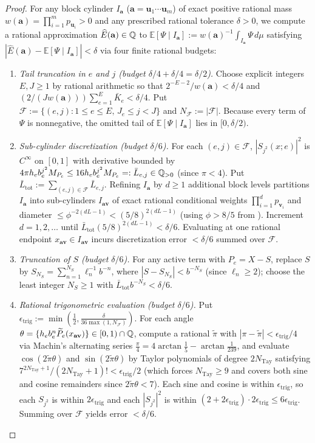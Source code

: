 \documentclass[11pt]{article}
\newcommand{\fr}[1]{\{#1\}}
\newcommand{\Ex}{\mathbb{E}}
\newcommand{\epsTrig}{\epsilon_{\mathrm{trig}}}
\newcommand{\NTay}{N_{\mathrm{Tay}}}
\begin{document}
\begin{proof}
For any block cylinder $I_{\mathbf{a}}$ ($\mathbf{a}=\mathbf{u}_1\cdots\mathbf{u}_m$) of exact positive rational mass $w(\mathbf{a})=\prod_{i=1}^m p_{\mathbf{u}_i}>0$ and any prescribed rational tolerance $\delta>0$, we compute a rational approximation $\widehat E(\mathbf{a})\in\mathbb Q$ to $\Ex[\Psi\mid I_{\mathbf{a}}]:=w(\mathbf{a})^{-1}\int_{I_{\mathbf{a}}}\Psi\,d\mu$ satisfying $|\widehat E(\mathbf{a})-\Ex[\Psi\mid I_{\mathbf{a}}]|<\delta$ via four finite rational budgets:
\begin{enumerate}[label=\textup{(\alph*)},nosep]
\item \emph{Tail truncation in $e$ and $j$ (budget $\delta/4+\delta/4=\delta/2$).} Choose explicit integers $E,J\ge1$ by rational arithmetic so that $2^{-E-2}/w(\mathbf{a})<\delta/4$ and $(2/(Jw(\mathbf{a})))\sum_{e=1}^E\bar K_e<\delta/4$. Put $\mathcal{F}:=\{(e,j):1\le e\le E,\,J_e\le j<J\}$ and $N_{\mathcal{F}}:=|\mathcal{F}|$. Because every term of $\Psi$ is nonnegative, the omitted tail of $\Ex[\Psi\mid I_{\mathbf{a}}]$ lies in $[0,\delta/2)$.
\item \emph{Sub-cylinder discretization (budget $\delta/6$).} For each $(e,j)\in\mathcal{F}$, $|S_{j^2}(x;e)|^2$ is $C^\infty$ on $[0,1]$ with derivative bounded by $4\pi h_eb_e^{j^2}M_{P_e}\le 16h_eb_e^{j^2}M_{P_e}=:\bar L_{e,j}\in\mathbb Q_{>0}$ (since $\pi<4$). Put $\bar L_{\mathrm{tot}}:=\sum_{(e,j)\in\mathcal{F}}\bar L_{e,j}$. Refining $I_{\mathbf{a}}$ by $d\ge1$ additional block levels partitions $I_{\mathbf{a}}$ into sub-cylinders $I_{\mathbf{a}\mathbf{v}}$ of exact rational conditional weights $\prod_{i=1}^d p_{\mathbf{v}_i}$ and diameter $\le\phi^{-2(dL-1)}<(5/8)^{2(dL-1)}$ (using $\phi>8/5$ from ). Increment $d=1,2,\dots$ until $\bar L_{\mathrm{tot}}(5/8)^{2(dL-1)}<\delta/6$. Evaluating at one rational endpoint $x_{\mathbf{a}\mathbf{v}}\in I_{\mathbf{a}\mathbf{v}}$ incurs discretization error $<\delta/6$ summed over $\mathcal{F}$.
\item \emph{Truncation of $S$ (budget $\delta/6$).} For any active term with $P_e=X-S$, replace $S$ by $S_{N_S}=\sum_{n=1}^{N_S}\ell_n^{-1}b^{-n}$, where $|S-S_{N_S}|<b^{-N_S}$ (since $\ell_n\ge2$); choose the least integer $N_S\ge1$ with $\bar L_{\mathrm{tot}}b^{-N_S}<\delta/6$.
\item \emph{Rational trigonometric evaluation (budget $\delta/6$).} Put $\epsTrig:=\min(\frac12,\frac{\delta}{36\max(1,N_{\mathcal{F}})})$. For each angle $\theta=\fr{h_eb_e^n\widetilde{P}_e(x_{\mathbf{a}\mathbf{v}})}\in[0,1)\cap\Q$, compute a rational $\tilde\pi$ with $|\pi-\tilde\pi|<\epsTrig/4$ via Machin's alternating series $\frac\pi4=4\arctan\frac15-\arctan\frac1{239}$, and evaluate $\cos(2\tilde\pi\theta)$ and $\sin(2\tilde\pi\theta)$ by Taylor polynomials of degree $2\NTay$ satisfying $7^{2\NTay+1}/(2\NTay+1)!<\epsTrig/2$ (which forces $\NTay\ge9$ and covers both sine and cosine remainders since $2\tilde\pi\theta<7$). Each sine and cosine is within $\epsTrig$, so each $S_{j^2}$ is within $2\epsTrig$ and each $|S_{j^2}|^2$ is within $(2+2\epsTrig)\cdot2\epsTrig\le 6\epsTrig$. Summing over $\mathcal{F}$ yields error $<\delta/6$.

\end{enumerate}
\end{proof}
\end{document}
